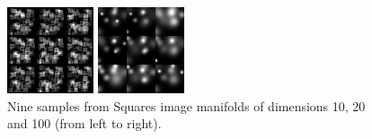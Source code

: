 \begin{figure}[h]
\begin{minipage}{.3\textwidth}
            \includegraphics[width=.75\columnwidth]{chapter3/figures/image_manifolds/squares/100.png}
        \end{minipage} 
        \caption{Nine samples from Squares image manifolds of dimensions 10, 20 and 100 (from left to right).}
        \label{ch3:fig:squares}
        \vspace{10pt}
       \begin{minipage}{.3\textwidth}
            \centering
            \includegraphics[width=.75\columnwidth]{chapter3/figures/image_manifolds/blobs/10.png}
        \end{minipage}
        \begin{minipage}{.3\textwidth}
            \centering

\end{minipage}
\end{figure}
